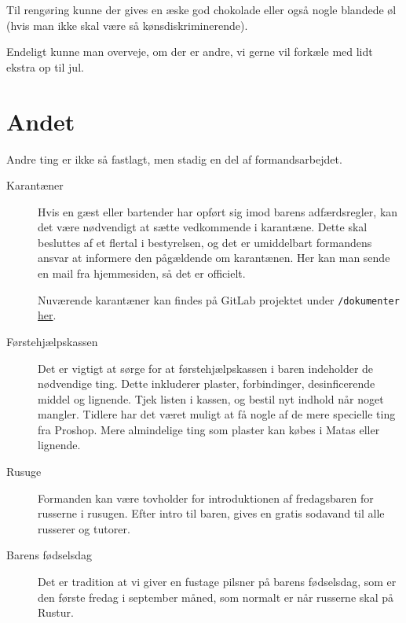 Til rengøring kunne der gives en æske god chokolade eller også nogle
blandede øl (hvis man ikke skal være så kønsdiskriminerende).

Endeligt kunne man overveje, om der er andre, vi gerne vil forkæle med
lidt ekstra op til jul.

\section{Andet}
\label{sec:andet}

Andre ting er ikke så fastlagt, men stadig en del af formandsarbejdet.

\begin{description}
    \item[Karantæner] Hvis en gæst eller bartender har opført sig imod barens adfærdsregler,
    kan det være nødvendigt at sætte vedkommende i karantæne. Dette
    skal besluttes af et flertal i bestyrelsen, og det er umiddelbart formandens
    ansvar at informere den pågældende om karantænen. Her kan man sende en mail
    fra hjemmesiden, så det er officielt.

    Nuværende karantæner kan findes på GitLab projektet under \texttt{/dokumenter} 
    \href{https://gitlab.au.dk/fredagscafeen/dokumenter/-/blob/main/Karantaener.md?ref_type=heads}{her}.

    \item[Førstehjælpskassen] Det er vigtigt at sørge for at
    førstehjælpskassen i baren indeholder de nødvendige ting. Dette
    inkluderer plaster, forbindinger, desinficerende middel
    og lignende. Tjek listen i kassen, og bestil nyt indhold
    når noget mangler. Tidlere har det været muligt at få nogle 
    af de mere specielle ting fra Proshop. Mere almindelige ting
    som plaster kan købes i Matas eller lignende.

    \item[Rusuge] Formanden kan være tovholder for introduktionen af fredagsbaren for russerne i rusugen.
    Efter intro til baren, gives en gratis sodavand til alle russerer og tutorer.

    \item[Barens fødselsdag] Det er tradition at vi giver en fustage pilsner på barens
    fødselsdag, som er den første fredag i september måned, som normalt er når russerne
    skal på Rustur.
\end{description}



